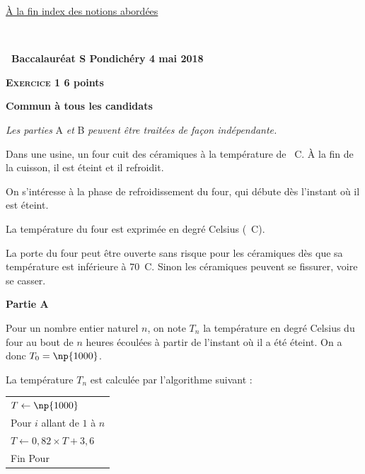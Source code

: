 \documentclass[10pt,a4paper]{article}
\begin{document}
\vspace{1cm}\hyperlink{Index}{À la fin index des notions abordées}

\newpage ~
\newpage
\hypertarget{Pondichery}{}

\label{Pondichery}
\pagestyle{fancy}
\thispagestyle{empty}

\begin{center}{\Large\textbf{\decofourleft~Baccalauréat S Pondichéry 4 mai 2018~\decofourright}}
\end{center}

\vspace{0,25cm}

\textbf{\textsc{Exercice 1} \hfill 6 points}
 
\textbf{Commun  à tous les candidats}

\medskip

\emph{Les parties } A \emph{et}   B \emph{peuvent être traitées de façon indépendante.}

\bigskip


Dans une usine, un four cuit des céramiques à la température de ~\degres C. À la fin de la
cuisson, il est éteint et il refroidit.

\smallskip

On s'intéresse à la phase de refroidissement du four, qui débute dès l'instant où il est éteint.

\smallskip

La température du four est exprimée en degré Celsius (\degres~C).

\smallskip

La porte du four peut être ouverte sans risque pour les céramiques dès que sa température est
inférieure à $70$~\degres C. Sinon les céramiques peuvent se fissurer, voire se casser.

\bigskip

\textbf{Partie A}

\medskip

Pour un nombre entier naturel $n$, on note $T_n$ la température en degré Celsius du four au bout
de $n$ heures écoulées à partir de l'instant où il a été éteint. On a donc $T_0 = \np{1000}$.

La température $T_n$ est calculée par l'algorithme suivant :

\begin{center}
\begin{tabularx}{0.35\linewidth}{|X|}\hline
$T \gets \np{1000}$\\
Pour $i$ allant de $1$ à $n$\\
\hspace{1cm}$T \gets 0,82 \times T + 3,6$\\
Fin Pour\\\hline
\end{tabularx}
\end{center}
\end{document}
